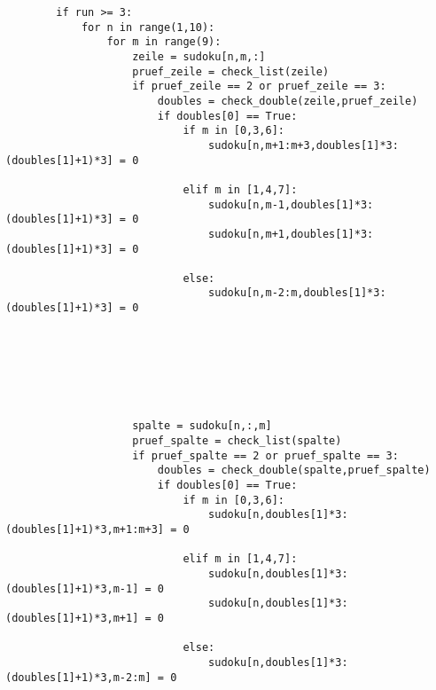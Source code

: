 \documentclass[11pt,a4paper]{article}
\begin{document}
\begin{verbatim}
        if run >= 3:                                   
            for n in range(1,10):                      
                for m in range(9):                   
                    zeile = sudoku[n,m,:]                  
                    pruef_zeile = check_list(zeile)        
                    if pruef_zeile == 2 or pruef_zeile == 3: 
                        doubles = check_double(zeile,pruef_zeile) 
                        if doubles[0] == True:                   
                            if m in [0,3,6]:                                                    
                                sudoku[n,m+1:m+3,doubles[1]*3:(doubles[1]+1)*3] = 0
                            
                            elif m in [1,4,7]:
                                sudoku[n,m-1,doubles[1]*3:(doubles[1]+1)*3] = 0
                                sudoku[n,m+1,doubles[1]*3:(doubles[1]+1)*3] = 0
                            
                            else:
                                sudoku[n,m-2:m,doubles[1]*3:(doubles[1]+1)*3] = 0
                            
                            
                    
                    
                    
                    
                    
                    spalte = sudoku[n,:,m]              
                    pruef_spalte = check_list(spalte)   
                    if pruef_spalte == 2 or pruef_spalte == 3:     
                        doubles = check_double(spalte,pruef_spalte) 
                        if doubles[0] == True:
                            if m in [0,3,6]:                  
                                sudoku[n,doubles[1]*3:(doubles[1]+1)*3,m+1:m+3] = 0
                            
                            elif m in [1,4,7]:
                                sudoku[n,doubles[1]*3:(doubles[1]+1)*3,m-1] = 0
                                sudoku[n,doubles[1]*3:(doubles[1]+1)*3,m+1] = 0
                            
                            else:
                                sudoku[n,doubles[1]*3:(doubles[1]+1)*3,m-2:m] = 0    
\end{verbatim}
\ \\
\end{document}
